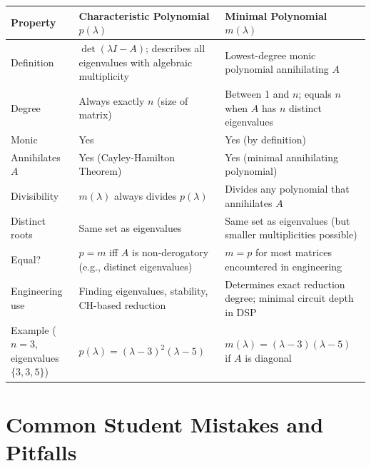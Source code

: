 \documentclass[12pt,a4paper]{article}
\begin{document}
\begin{center}
\renewcommand{\arraystretch}{1.4}
\begin{tabular}{@{}p{3.5cm} p{5.5cm} p{5.5cm}@{}}
\toprule
\textbf{Property} & \textbf{Characteristic Polynomial $p(\lambda)$} & \textbf{Minimal Polynomial $m(\lambda)$} \\
\midrule
Definition &
$\det(\lambda I - A)$; describes all eigenvalues with algebraic multiplicity &
Lowest-degree monic polynomial annihilating $A$ \\
Degree &
Always exactly $n$ (size of matrix) &
Between 1 and $n$; equals $n$ when $A$ has $n$ distinct eigenvalues \\
Monic &
Yes &
Yes (by definition) \\
Annihilates $A$ &
Yes (Cayley-Hamilton Theorem) &
Yes (minimal annihilating polynomial) \\
Divisibility &
$m(\lambda)$ always divides $p(\lambda)$ &
Divides any polynomial that annihilates $A$ \\
Distinct roots &
Same set as eigenvalues &
Same set as eigenvalues (but smaller multiplicities possible) \\
Equal? &
$p = m$ iff $A$ is non-derogatory (e.g., distinct eigenvalues) &
$m = p$ for most matrices encountered in engineering \\
Engineering use &
Finding eigenvalues, stability, CH-based reduction &
Determines exact reduction degree; minimal circuit depth in DSP \\
Example ($n=3$, eigenvalues $\{3,3,5\}$) &
$p(\lambda)=(\lambda-3)^{2}(\lambda-5)$ &
$m(\lambda)=(\lambda-3)(\lambda-5)$ if $A$ is diagonal \\
\bottomrule
\end{tabular}
\end{center}

\section{Common Student Mistakes and Pitfalls}
\end{document}

